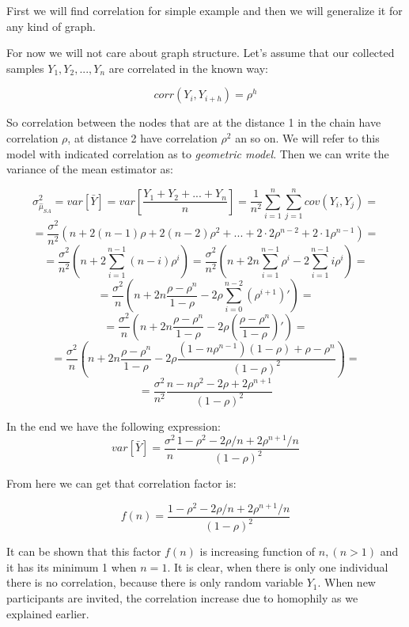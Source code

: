 \documentclass[12pt]{report}
\begin{document}
First we will find correlation for simple example and then we will generalize it for any kind of graph.

For now we will not care about graph structure. Let's assume that our collected samples $Y_1, Y_2, ..., Y_n$ are correlated in the known way:

 $$corr(Y_i, Y_{i+h}) = \rho^h$$

So correlation between the nodes that are at the distance 1 in the chain have correlation $\rho$, at distance 2 have correlation $\rho^2$ an so on. We will refer to this model with indicated correlation as to \textit{geometric model}.
Then we can write the variance of the mean estimator as: 

$$\sigma^2_{\hat{\mu}_{SA}} = var\left[\bar{Y} \right] = var\left[ \frac{Y_1 + Y_2 + ...+ Y_n}{n} \right] = \frac{1}{n^2} \sum_{i=1}^{n}\sum_{j=1}^{n} cov(Y_i, Y_j) =$$ 
$$ = \frac{\sigma^2}{n^2} \left( n + 2(n-1)\rho + 2(n-2)\rho^2 + ... + 2\cdot2 \rho^{n-2}+ 2\cdot1 \rho^{n-1} \right) = $$
$$ = \frac{\sigma^2}{n^2} \left(n + 2\sum_{i=1}^{n-1} (n-i)\rho^i \right) = \frac{\sigma^2}{n^2} \left(n + 2n\sum_{i=1}^{n-1}\rho^i - 2\sum_{i=1}^{n-1}i\rho^i \right) = $$
$$ = \frac{\sigma^2}{n} \left(n + 2n\frac{\rho-\rho^{n}}{1-\rho} - 2\rho \sum_{i=0}^{n-2} (\rho^{i+1})' \right) = $$
$$ = \frac{\sigma^2}{n} \left(n + 2n\frac{\rho-\rho^{n}}{1-\rho} - 2\rho\left(\frac{\rho-\rho^n}{1-\rho}\right)' \right) = $$
$$ = \frac{\sigma^2}{n} \left(n + 2n\frac{\rho-\rho^{n}}{1-\rho} - 2\rho \frac{(1-n\rho^{n-1})(1-\rho) + \rho - \rho^n}{(1-\rho)^2} \right) = $$
$$ = \frac{\sigma^2}{n^2} \frac{n-n\rho^2 - 2\rho + 2\rho^{n+1}}{(1-\rho)^2}$$

In the end we have the following expression:
\begin{equation}\label{eq:varFirst}
var\left[\bar{Y} \right] = \frac{\sigma^2}{n}\frac{1-\rho^2 - 2\rho/n + 2\rho^{n+1}/n}{(1-\rho)^2}
\end{equation}


From here we can get that correlation factor is:

$$f(n) = \frac{1-\rho^2 - 2\rho/n + 2\rho^{n+1}/n}{(1-\rho)^2} $$

It can be shown that this factor $f(n)$ is increasing function of $n, (n > 1)$ and it has its minimum 1 when $n = 1$. It is clear, when there is only one individual there is no correlation, because there is only random variable $Y_1$. When new participants are invited, the correlation increase due to homophily as we explained earlier.
\end{document}
